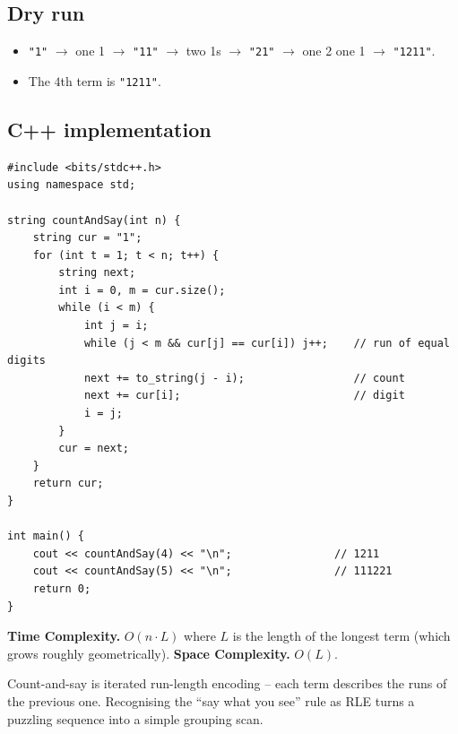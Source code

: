 \subsection*{Dry run}


\begin{itemize}
  \item \texttt{"1"} $\to$ one 1 $\to$ \texttt{"11"} $\to$ two 1s $\to$
        \texttt{"21"} $\to$ one 2 one 1 $\to$ \texttt{"1211"}.
  \item The $4$th term is \texttt{"1211"}.
\end{itemize}

\subsection*{C++ implementation}

\begin{lstlisting}
#include <bits/stdc++.h>
using namespace std;

string countAndSay(int n) {
    string cur = "1";
    for (int t = 1; t < n; t++) {
        string next;
        int i = 0, m = cur.size();
        while (i < m) {
            int j = i;
            while (j < m && cur[j] == cur[i]) j++;    // run of equal digits
            next += to_string(j - i);                 // count
            next += cur[i];                           // digit
            i = j;
        }
        cur = next;
    }
    return cur;
}

int main() {
    cout << countAndSay(4) << "\n";                // 1211
    cout << countAndSay(5) << "\n";                // 111221
    return 0;
}
\end{lstlisting}

\begin{complexitybox}
\textbf{Time Complexity.} $O(n\cdot L)$ where $L$ is the length of the
longest term (which grows roughly geometrically). \textbf{Space
Complexity.} $O(L)$.
\end{complexitybox}

\begin{takeawaybox}
Count-and-say is iterated run-length encoding -- each term describes the
runs of the previous one. Recognising the ``say what you see'' rule as RLE
turns a puzzling sequence into a simple grouping scan.
\end{takeawaybox}
